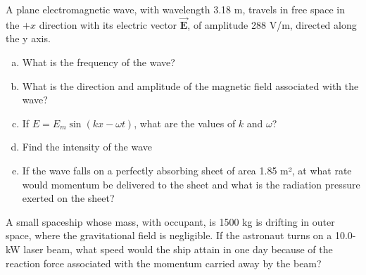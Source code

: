 \documentclass[12pt,letterpaper]{hmcpset}
\begin{document}
	\begin{problem}[38P13:]
		A plane electromagnetic wave, with wavelength 3.18 m, travels in free space in the $+x$ direction with its electric vector $\vec{\mathbf{E}}$, of amplitude 288 V/m, directed along the y axis.
		\begin{enumerate}[(a)]
			\item What is the frequency of the wave?
			\item What is the direction and amplitude of the magnetic field associated with the wave?
			\item If $E = E_m\sin{(kx - \omega t)}$, what are the values of $k$ and $\omega$?
			\item Find the intensity of the wave
			\item If the wave falls on a perfectly absorbing sheet of area 1.85 m², at what rate would momentum be delivered to the sheet and what is the radiation pressure exerted on the sheet?
		\end{enumerate}
	\end{problem}
	\clearpage



	\begin{problem}[38E42:]
		A small spaceship whose mass, with occupant, is 1500 kg is drifting in outer space, where the gravitational field is negligible.
		If the astronaut turns on a 10.0-kW laser beam, what speed would the ship attain in one day because of the reaction force associated with the momentum carried away by the beam?
	\end{problem}
	\clearpage
\end{document}
